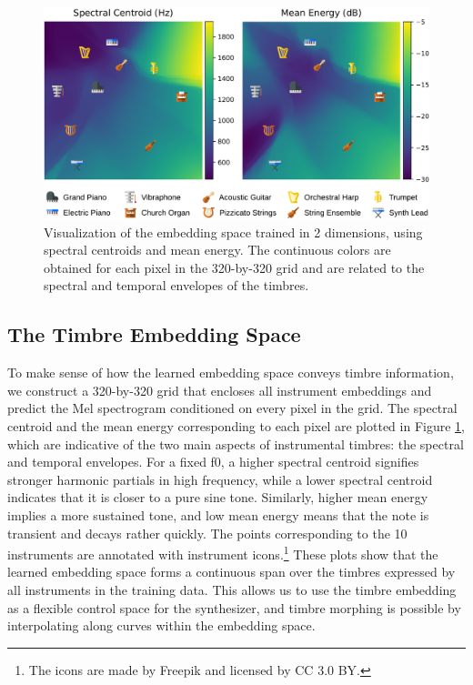 \begin{figure}[t]
	\centering
	\includegraphics[width=\columnwidth]{runpixels.pdf}
	\caption{Visualization of the embedding space trained in 2 dimensions, using spectral centroids and mean energy. The continuous colors are obtained for each pixel in the 320-by-320 grid and are related to the spectral and temporal envelopes of the timbres.}
	\label{fig:embedding}
	\vspace{-1em}
\end{figure}

\subsection{The Timbre Embedding Space}

To make sense of how the learned embedding space conveys timbre information, we construct a 320-by-320 grid that encloses all instrument embeddings and predict the Mel spectrogram conditioned on every pixel in the grid.
The spectral centroid and the mean energy corresponding to each pixel are plotted in Figure \ref{fig:embedding}, which are indicative of the two main aspects of instrumental timbres: the spectral and temporal envelopes.
For a fixed f0, a higher spectral centroid signifies stronger harmonic partials in high frequency, while a lower spectral centroid indicates that it is closer to a pure sine tone.
Similarly, higher mean energy implies a more sustained tone, and low mean energy means that the note is transient and decays rather quickly.
The points corresponding to the 10 instruments are annotated with instrument icons.\footnote{The icons are made by Freepik and licensed by CC 3.0 BY.}
These plots show that the learned embedding space forms a continuous span over the timbres expressed by all instruments in the training data.
This allows us to use the timbre embedding as a flexible control space for the synthesizer, and timbre morphing is possible by interpolating along curves within the embedding space.

